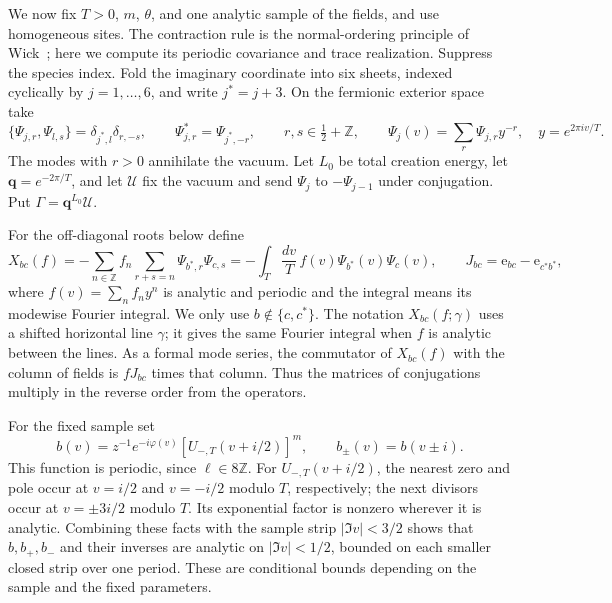 We now fix $T>0$, $m$, $\theta$, and one analytic sample of the fields, and use homogeneous sites. The contraction rule is the normal-ordering principle of Wick~\cite{Wick1950}; here we compute its periodic covariance and trace realization. Suppress the species index. Fold the imaginary coordinate into six sheets, indexed cyclically by $j=1,\ldots,6$, and write $j^*=j+3$. On the fermionic exterior space take
\[
\{\Psi_{j,r},\Psi_{l,s}\}=\delta_{j^*,l}\delta_{r,-s},
\qquad
\Psi_{j,r}^*=\Psi_{j^*,-r},
\qquad r,s\in\tfrac12+\mathbb Z,
\qquad
\Psi_j(v)=\sum_r\Psi_{j,r}y^{-r},\quad y=e^{2\pi i v/T}.
\]
The modes with $r>0$ annihilate the vacuum. Let $L_0$ be total creation energy, let $\mathbf q=e^{-2\pi/T}$, and let $\mathcal U$ fix the vacuum and send $\Psi_j$ to $-\Psi_{j-1}$ under conjugation. Put $\Gamma=\mathbf q^{L_0}\mathcal U$.

For the off-diagonal roots below define
\[
X_{bc}(f)=-\sum_{n\in\mathbb Z}f_n
 \sum_{r+s=n}\Psi_{b^*,r}\Psi_{c,s}
=-\int_T\frac{dv}{T}\,f(v)\Psi_{b^*}(v)\Psi_c(v),
\qquad
J_{bc}=\mathrm e_{bc}-\mathrm e_{c^*b^*},
\]
where $f(v)=\sum_nf_ny^n$ is analytic and periodic and the integral means its modewise Fourier integral. We only use $b\notin\{c,c^*\}$. The notation $X_{bc}(f;\gamma)$ uses a shifted horizontal line $\gamma$; it gives the same Fourier integral when $f$ is analytic between the lines. As a formal mode series, the commutator of $X_{bc}(f)$ with the column of fields is $fJ_{bc}$ times that column. Thus the matrices of conjugations multiply in the reverse order from the operators.

For the fixed sample set
\[
b(v)=z^{-1}e^{-i\varphi(v)}[U_{-,T}(v+i/2)]^m,
\qquad b_\pm(v)=b(v\pm i).
\]
This function is periodic, since $\ell\in8\mathbb Z$. For $U_{-,T}(v+i/2)$, the nearest zero and pole occur at $v=i/2$ and $v=-i/2$ modulo $T$, respectively; the next divisors occur at $v=\pm3i/2$ modulo $T$. Its exponential factor is nonzero wherever it is analytic. Combining these facts with the sample strip $|\Im v|<3/2$ shows that $b,b_+,b_-$ and their inverses are analytic on $|\Im v|<1/2$, bounded on each smaller closed strip over one period. These are conditional bounds depending on the sample and the fixed parameters.

